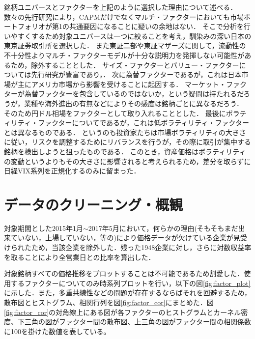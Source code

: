 \documentclass[11pt]{jreport}
\begin{document}
銘柄ユニバースとファクターを上記のように選択した理由について述べる．
数々の先行研究により，CAPMだけでなくマルチ・ファクターにおいても市場ポートフォリオが第1の共通要因になることに疑いの余地はない．
そこで分析を行いやすくするため対象ユニバースは一つに絞ることを考え，馴染みの深い日本の東京証券取引所を選択した．
また東証二部や東証マザーズに関して，流動性の不十分性よりマルチ・ファクターモデルが十分な説明力を発揮しない可能性があるため，除外することとした．
サイズ・ファクターとバリュー・ファクターについては先行研究が豊富であり，．
次に為替ファクターであるが，これは日本市場が主にアメリカ市場から影響を受けることに起因する．
マーケット・ファクターが為替ファクターを包含しているのではないか，という疑問は持たれるだろうが，業種や海外進出の有無などによりその感度は銘柄ごとに異なるだろう．
そのため円ドル相場をファクターとして取り入れることとした．
最後にボラティリティ・ファクターについてであるが，これは低ボラティリティ・ファクターとは異なるものである．
というのも投資家たちは市場ボラティリティの大きさに従い，リスクを調整するためにリバランスを行うが，その際に取引が集中する銘柄を検出しようと狙ったものである．
このとき，資産価格はボラティリティの変動というよりもその大きさに影響されると考えられるため，差分を取らずに日経VIX系列を正規化するのみに留まった．

\section{データのクリーニング・概観}
対象期間とした2015年1月$\sim$2017年5月において，何らかの理由(そもそもまだ出来ていない，上場していない，等の)により価格データが欠けている企業が見受けられたため，当該企業を除外した．残った1948企業に対し，さらに対数収益率を取ることにより全営業日との比率を算出した．

対象銘柄すべての価格推移をプロットすることは不可能であるため割愛した．使用するファクターについてのみ時系列プロットを行い，以下の図\ref{fig:factor_plot}に示した．また，多重共線性などの問題が存在するならばそれを回避するため，散布図とヒストグラム、相関行列を図\ref{fig:factor_cor}にまとめた．図\ref{fig:factor_cor}の対角線上にある図が各ファクターのヒストグラムとカーネル密度、下三角の図がファクター間の散布図、上三角の図がファクター間の相関係数に100を掛けた数値を表している。
\end{document}
